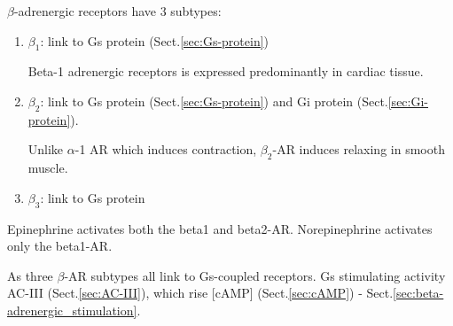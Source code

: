 
$\beta$-adrenergic receptors have 3 subtypes:
\begin{enumerate}
  \item $\beta_1$: link to Gs protein (Sect.\ref{sec:Gs-protein})

Beta-1 adrenergic receptors is expressed predominantly in cardiac tissue.
  
  \item $\beta_2$: link to Gs protein (Sect.\ref{sec:Gs-protein}) and 
  Gi protein (Sect.\ref{sec:Gi-protein}).
  

Unlike $\alpha$-1 AR which induces contraction, $\beta_2$-AR induces relaxing in
smooth muscle.
  
  \item $\beta_3$: link to Gs protein  
\end{enumerate}
Epinephrine activates both the beta1 and beta2-AR. Norepinephrine
activates only the beta1-AR.

As three $\beta$-AR subtypes all link to Gs-coupled receptors.
Gs stimulating activity AC-III (Sect.\ref{sec:AC-III}),
which rise [cAMP] (Sect.\ref{sec:cAMP}) -
Sect.\ref{sec:beta-adrenergic_stimulation}.

